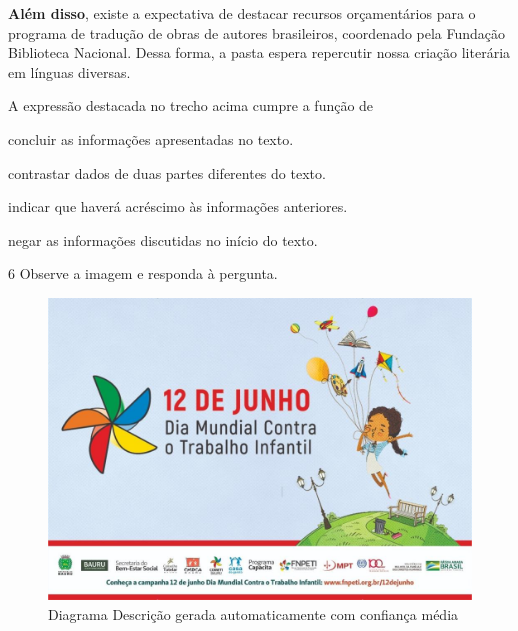 \begin{myquote}
\begin{myescolha}
\begin{myquote}
\textbf{Além disso}, existe a expectativa de destacar recursos orçamentários
para o programa de tradução de obras de autores brasileiros, coordenado
pela Fundação Biblioteca Nacional. Dessa forma, a pasta espera
repercutir nossa criação literária em línguas diversas.

\end{myquote}

A expressão destacada no trecho acima cumpre a função de

\begin{escolha}
  \item concluir as informações apresentadas no texto.

  \item contrastar dados de duas partes diferentes do texto.

  \item indicar que haverá acréscimo às informações anteriores.

  \item negar as informações discutidas no início do texto.
\end{escolha}

\num{6} Observe a imagem e responda à pergunta.

\begin{myquote}
\begin{figure}
\centering
\includegraphics[width=.5\textwidth]{./imgQ4PORT/media/image6.jpeg}
\caption{Diagrama Descrição gerada automaticamente com confiança média}
\end{figure}

\end{myquote}


\end{myescolha}
\end{myquote}
